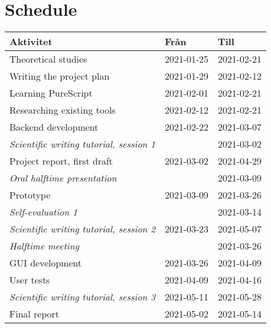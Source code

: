 \section{Schedule}

\begin{center}
    \begin{tabular}{|l|l|l|}
        \hline
        \textbf{Aktivitet}                              & \textbf{Från} & \textbf{Till} \\ \hline
        Theoretical studies                             & 2021-01-25    & 2021-02-21    \\ \hline
        Writing the project plan                        & 2021-01-29    & 2021-02-12    \\ \hline
        Learning PureScript                             & 2021-02-01    & 2021-02-21    \\ \hline
        Researching existing tools                      & 2021-02-12    & 2021-02-21    \\ \hline
        Backend development                             & 2021-02-22    & 2021-03-07    \\ \hline
        \textit{Scientific writing tutorial, session 1} &               & 2021-03-02    \\ \hline
        Project report, first draft                     & 2021-03-02    & 2021-04-29    \\ \hline
        \textit{Oral halftime presentation}             &               & 2021-03-09    \\ \hline
        Prototype                                       & 2021-03-09    & 2021-03-26    \\ \hline
        \textit{Self-evaluation 1}                      &               & 2021-03-14    \\ \hline
        \textit{Scientific writing tutorial, session 2} & 2021-03-23    & 2021-05-07    \\ \hline
        \textit{Halftime meeting}                       &               & 2021-03-26    \\ \hline
        GUI development                                 & 2021-03-26    & 2021-04-09    \\ \hline
        User tests                                      & 2021-04-09    & 2021-04-16    \\ \hline
        \textit{Scientific writing tutorial, session 3} & 2021-05-11    & 2021-05-28    \\ \hline
        {Final report}                                  & 2021-05-02    & 2021-05-14    \\ \hline

\end{tabular}
\end{center}
